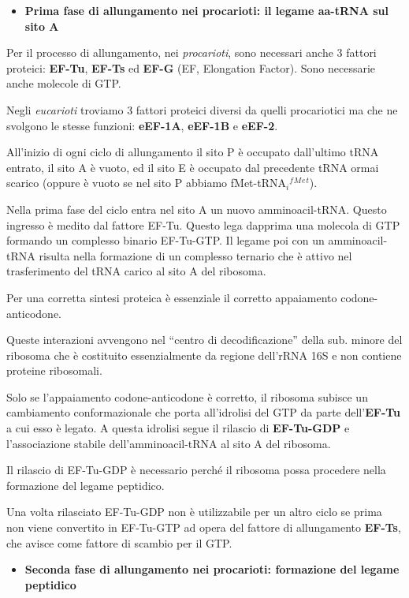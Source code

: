 \documentclass[11pt]{book}
\begin{document}
\begin{itemize}
\itemsep1pt\parskip0pt
\item
  \textbf{Prima fase di allungamento nei procarioti: il legame aa-tRNA
  sul sito A}
\end{itemize}

Per il processo di allungamento, nei \emph{procarioti}, sono necessari
anche 3 fattori proteici: \textbf{EF-Tu}, \textbf{EF-Ts} ed
\textbf{EF-G} (EF, Elongation Factor). Sono necessarie anche molecole di
GTP.

Negli \emph{eucarioti} troviamo 3 fattori proteici diversi da quelli
procariotici ma che ne svolgono le stesse funzioni: \textbf{eEF-1A},
\textbf{eEF-1B} e \textbf{eEF-2}.

All'inizio di ogni ciclo di allungamento il sito P è occupato
dall'ultimo tRNA entrato, il sito A è vuoto, ed il sito E è occupato dal
precedente tRNA ormai scarico (oppure è vuoto se nel sito P abbiamo
fMet-tRNA\(_i\)\(^f\)\(^M\)\(^e\)\(^t\)).

Nella prima fase del ciclo entra nel sito A un nuovo amminoacil-tRNA.
Questo ingresso è medito dal fattore EF-Tu. Questo lega dapprima una
molecola di GTP formando un complesso binario EF-Tu-GTP. Il legame poi
con un amminoacil-tRNA risulta nella formazione di un complesso ternario
che è attivo nel trasferimento del tRNA carico al sito A del ribosoma.

Per una corretta sintesi proteica è essenziale il corretto appaiamento
codone-anticodone.

Queste interazioni avvengono nel ``centro di decodificazione'' della
sub. minore del ribosoma che è costituito essenzialmente da regione
dell'rRNA 16S e non contiene proteine ribosomali.

Solo se l'appaiamento codone-anticodone è corretto, il ribosoma subisce
un cambiamento conformazionale che porta all'idrolisi del GTP da parte
dell'\textbf{EF-Tu} a cui esso è legato. A questa idrolisi segue il
rilascio di \textbf{EF-Tu-GDP} e l'associazione stabile
dell'amminoacil-tRNA al sito A del ribosoma.

Il rilascio di EF-Tu-GDP è necessario perché il ribosoma possa procedere
nella formazione del legame peptidico.

Una volta rilasciato EF-Tu-GDP non è utilizzabile per un altro ciclo se
prima non viene convertito in EF-Tu-GTP ad opera del fattore di
allungamento \textbf{EF-Ts}, che avisce come fattore di scambio per il
GTP.

\begin{itemize}
\itemsep1pt\parskip0pt
\item
  \textbf{Seconda fase di allungamento nei procarioti: formazione del
  legame peptidico}
\end{itemize}
\end{document}
